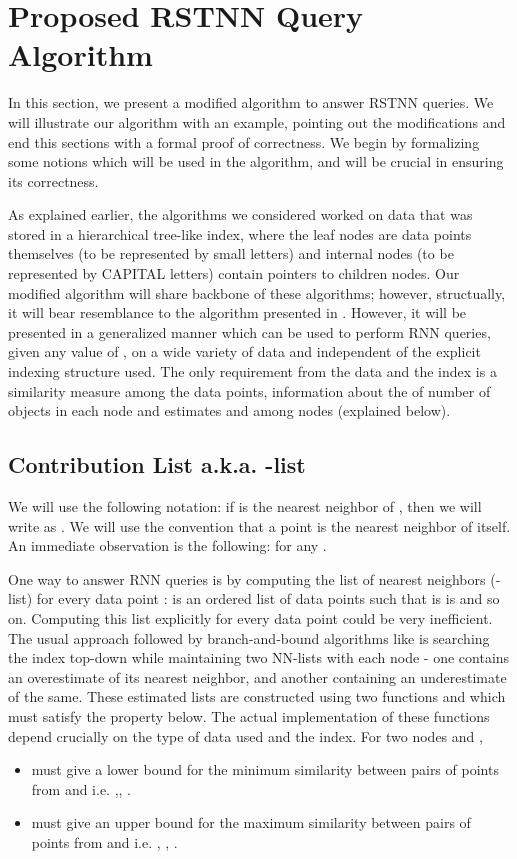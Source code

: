 \documentclass[prodmode,letterpaper]{acmsmall}
\newcommand{\rknn}{RNN\xspace}
\newcommand{\rstknn}{RSTNN\xspace}
\begin{document}
\section{Proposed \rstknn Query Algorithm }\label{section:algo}
In this section, we present a modified algorithm to answer \rstknn
queries. We will illustrate our algorithm with an example, pointing
out the modifications and end this sections with a formal
proof of correctness. We begin by formalizing some notions which will be
used in the algorithm, and will be crucial in ensuring its correctness.

As explained earlier, the algorithms we considered worked on data that was stored in a hierarchical
tree-like index, where the leaf nodes are data points themselves (to
be represented by small letters) and internal nodes (to be represented by
CAPITAL letters) contain pointers to children
nodes.
Our modified algorithm will share backbone of these algorithms; however,
structually, it will bear resemblance to the algorithm presented in
\cite{lu2011reverse,lu2014efficient}. However, it will be presented in a
generalized manner which can be used to perform \rknn queries, given any value
of , on a wide variety of data and 
independent of the explicit indexing structure used.
The only requirement from the data and the index is a similarity measure 
among the data points, information about the of number of objects in each
node and estimates  and  among nodes (explained below).

\subsection{Contribution List a.k.a. -list}
We will use the following notation: if  is the  nearest neighbor of , then we will write  as .
We will use the convention that
a point is the  nearest neighbor of itself.
An immediate observation is the following: 
for any .

One way to answer \rknn queries
is by computing the list of nearest neighbors (-list) for every data point :
 is an ordered list of data points  such
that  is   is  and so on. Computing this list explicitly for
every data point could be very inefficient. 
The usual approach followed by branch-and-bound algorithms like
\cite{achtert2009reverse,lu2011reverse,lu2014efficient} is searching the index top-down
while maintaining two NN-lists with each node - one contains an
overestimate of its nearest neighbor, and another containing an underestimate of
the same. These estimated lists are constructed using two functions
 and  which must satisfy the
property below. The actual implementation of these functions depend crucially on
the type of data used and the index. For two nodes  and ,
\begin{itemize}
    \item  must give a lower bound for the minimum similarity between pairs of
points from  and  i.e.  ,,
.
    \item  must give an upper bound for the maximum similarity between pairs of points from  and  i.e.  , , .
\end{itemize}
\end{document}
